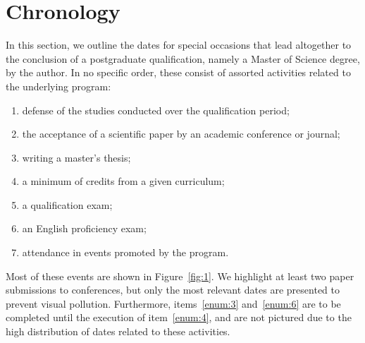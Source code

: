 \documentclass{article}
\title{}
\author{}
\date{}
\begin{document}
\section{Chronology}

In this section, we outline the dates for special occasions that lead altogether to the conclusion of a postgraduate qualification, namely a Master of Science degree, by the author. In no specific order, these consist of assorted activities related to the underlying program:

\begin{enumerate}[label=(\roman*)]
    \setlength\itemsep{1pt}
    \item\label{enum:0} defense of the studies conducted over the qualification period;
    \item\label{enum:1} the acceptance of a scientific paper by an academic conference or journal;
    \item\label{enum:2} writing a master's thesis;
    \item\label{enum:3} a minimum of credits from a given curriculum;
    \item\label{enum:4} a qualification exam;
    \item\label{enum:5} an English proficiency exam;
    \item\label{enum:6} attendance in events promoted by the program. 
\end{enumerate}

Most of these events are shown in Figure~\ref{fig:1}. We highlight at least two paper submissions to conferences, but only the most relevant dates are presented to prevent visual pollution. Furthermore, items~\ref{enum:3} and~\ref{enum:6} are to be completed until the execution of item~\ref{enum:4}, and are not pictured due to the high distribution of dates related to these activities.
\end{document}
